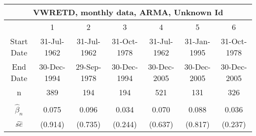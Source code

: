  \begin{table}[H] 
 \tiny 
 \centering 
\begin{tabular}{|c|c|c|c|c|c|c|} %
\multicolumn{7}{c}{ VWRETD, monthly data, ARMA, Unknown Id } \\ 
 \hline 
 &  1  &  2  &  3  &  4  &  5  &  6  \\ %
 Start Date &  31-Jul-1962 &  31-Jul-1962 &  31-Oct-1978 &  31-Jul-1962 &  31-Jan-1995 &  31-Oct-1978  \\ %
 End Date &  30-Dec-1994 &  29-Sep-1978 &  30-Dec-1994 &  30-Dec-2005 &  30-Dec-2005 &  30-Dec-2005  \\ %
 n &   389  &   194  &   194  &   521  &   131  &   326   \\ %
 \hline
 \hline
  &     &     &     &     &     &      \\ %
 $\hat{\beta}_{n}$ &  0.075 &  0.096 &  0.034 &  0.070 &  0.088 &  0.036  \\ %
 $\hat{se}$ &  (0.914) &  (0.735) &  (0.244) &  (0.637) &  (0.817) &  (0.237)  \\ %
 \hline 
\end{tabular}
 \end{table}

